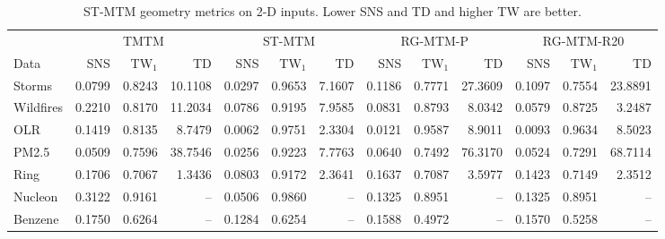\begin{table}[t]
\caption{ST-MTM geometry metrics on 2-D inputs. Lower SNS and TD and higher TW are better.}\label{tab:geometry2d}
\centering\scriptsize\setlength{\tabcolsep}{3pt}
\begin{tabular}{lrrrrrrrrrrrr}\toprule
 & \multicolumn{3}{c}{TMTM} & \multicolumn{3}{c}{ST-MTM} & \multicolumn{3}{c}{RG-MTM-P} & \multicolumn{3}{c}{RG-MTM-R20}\\
Data & SNS & TW$_1$ & TD & SNS & TW$_1$ & TD & SNS & TW$_1$ & TD & SNS & TW$_1$ & TD\\\midrule
Storms & 0.0799 & 0.8243 & 10.1108 & 0.0297 & 0.9653 & 7.1607 & 0.1186 & 0.7771 & 27.3609 & 0.1097 & 0.7554 & 23.8891\\
Wildfires & 0.2210 & 0.8170 & 11.2034 & 0.0786 & 0.9195 & 7.9585 & 0.0831 & 0.8793 & 8.0342 & 0.0579 & 0.8725 & 3.2487\\
OLR & 0.1419 & 0.8135 & 8.7479 & 0.0062 & 0.9751 & 2.3304 & 0.0121 & 0.9587 & 8.9011 & 0.0093 & 0.9634 & 8.5023\\
PM2.5 & 0.0509 & 0.7596 & 38.7546 & 0.0256 & 0.9223 & 7.7763 & 0.0640 & 0.7492 & 76.3170 & 0.0524 & 0.7291 & 68.7114\\
Ring & 0.1706 & 0.7067 & 1.3436 & 0.0803 & 0.9172 & 2.3641 & 0.1637 & 0.7087 & 3.5977 & 0.1423 & 0.7149 & 2.3512\\
Nucleon & 0.3122 & 0.9161 & -- & 0.0506 & 0.9860 & -- & 0.1325 & 0.8951 & -- & 0.1325 & 0.8951 & --\\
Benzene & 0.1750 & 0.6264 & -- & 0.1284 & 0.6254 & -- & 0.1588 & 0.4972 & -- & 0.1570 & 0.5258 & --\\
\bottomrule\end{tabular}
\par{}
\end{table}
